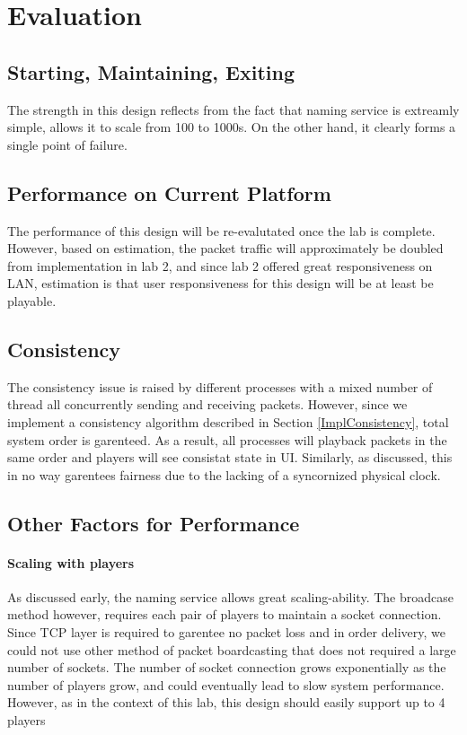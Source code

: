 \section{Evaluation}\label{Evaluation}

\subsection{Starting, Maintaining, Exiting}

The strength in this design reflects from the fact that naming service is extreamly simple, allows it to scale from 100 to 1000s. On the other hand, it clearly forms a single point of failure. 

\subsection{Performance on Current Platform}

The performance of this design will be re-evalutated once the lab is complete. However, based on estimation, the packet traffic will approximately be doubled from implementation in lab 2, and since lab 2 offered great responsiveness on LAN, estimation is that user responsiveness for this design will be at least be playable.

\subsection{Consistency}

The consistency issue is raised by different processes with a mixed number of thread all concurrently sending and receiving packets. However, since we implement a consistency algorithm described in Section \ref{ImplConsistency}, total system order is garenteed. As a result, all processes will playback packets in the same order and players will see consistat state in UI. Similarly, as discussed, this in no way garentees fairness due to the lacking of a syncornized physical clock.

\subsection{Other Factors for Performance}

\paragraph*{Scaling with players}

As discussed early, the naming service allows great scaling-ability. The broadcase method however, requires each pair of players to maintain a socket connection. Since TCP layer is required to garentee no packet loss and in order delivery, we could not use other method of packet boardcasting that does not required a large number of sockets. The number of socket connection grows exponentially as the number of players grow, and could eventually lead to slow system performance. However, as in the context of this lab, this design should easily support up to 4 players

